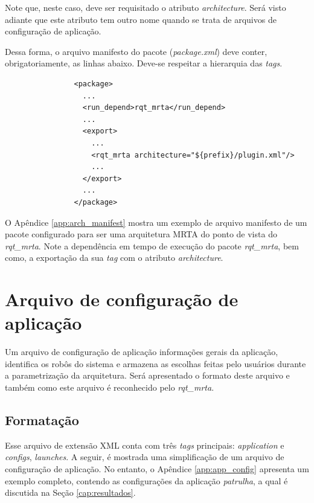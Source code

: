             Note que, neste caso, deve ser requisitado o atributo \textit{architecture}. Será visto adiante que este atributo tem outro nome quando se trata de arquivos de configuração de aplicação.
            
            Dessa forma, o arquivo manifesto do pacote (\textit{package.xml}) deve conter, obrigatoriamente, as linhas abaixo. Deve-se respeitar a hierarquia das \textit{tags}.
            
            \begin{lstlisting}
                <package>
                  ...
                  <run_depend>rqt_mrta</run_depend>
                  ...
                  <export>
                    ...
                    <rqt_mrta architecture="${prefix}/plugin.xml"/>
                    ...
                  </export>
                  ...
                </package>
            \end{lstlisting}
            
            O Apêndice \ref{app:arch_manifest} mostra um exemplo de arquivo manifesto de um pacote configurado para ser uma arquitetura MRTA do ponto de vista do \textit{rqt\_mrta}. Note a dependência em tempo de execução do pacote \textit{rqt\_mrta}, bem como, a exportação da sua \textit{tag} com o atributo \textit{architecture}.
    
    \section{Arquivo de configuração de aplicação} \label{sec:app_config}
        Um arquivo de configuração de aplicação informações gerais da aplicação, identifica os robôs do sistema e armazena as escolhas feitas pelo usuários durante a parametrização da arquitetura. Será apresentado o formato deste arquivo e também como este arquivo é reconhecido pelo \textit{rqt\_mrta}.
        
        \subsection{Formatação} \label{subsec:app_config_fmt}
            Esse arquivo de extensão XML conta com três \textit{tags} principais: \textit{application} e \textit{configs}, \textit{launches}. A seguir, é mostrada uma simplificação de um arquivo de configuração de aplicação. No entanto, o Apêndice \ref{app:app_config} apresenta um exemplo completo, contendo as configurações da aplicação \textit{patrulha}, a qual é discutida na Seção \ref{cap:resultados}.
            
